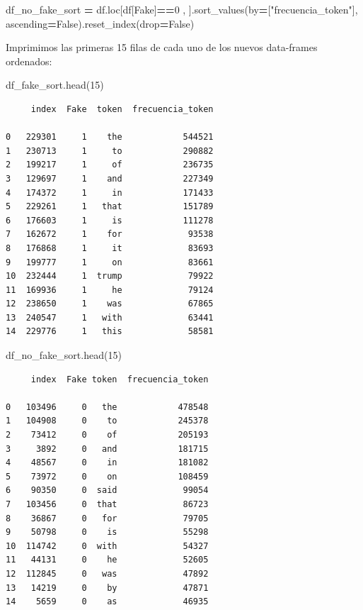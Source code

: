 \documentclass[
  11pt,
  a4paper,
]{article}
\newenvironment{Shaded}{\begin{snugshade}}{\end{snugshade}}
\newcommand{\DecValTok}[1]{\textcolor[rgb]{0.00,0.00,0.81}{#1}}
\newcommand{\NormalTok}[1]{#1}
\newcommand{\OperatorTok}[1]{\textcolor[rgb]{0.81,0.36,0.00}{\textbf{#1}}}
\newcommand{\StringTok}[1]{\textcolor[rgb]{0.31,0.60,0.02}{#1}}
\newcommand{\VariableTok}[1]{\textcolor[rgb]{0.00,0.00,0.00}{#1}}
\begin{document}
\begin{Shaded}
\begin{Highlighting}[]
\NormalTok{df\_no\_fake\_sort }\OperatorTok{=}\NormalTok{ df.loc[df[}\StringTok{\textquotesingle{}Fake\textquotesingle{}}\NormalTok{]}\OperatorTok{==}\DecValTok{0}\NormalTok{ , ].sort\_values(by}\OperatorTok{=}\NormalTok{[}\StringTok{"frecuencia\_token"}\NormalTok{], ascending}\OperatorTok{=}\VariableTok{False}\NormalTok{).reset\_index(drop}\OperatorTok{=}\VariableTok{False}\NormalTok{)}
\end{Highlighting}
\end{Shaded}

Imprimimos las primeras 15 filas de cada uno de los nuevos data-frames
ordenados:

\begin{Shaded}
\begin{Highlighting}[]
\NormalTok{df\_fake\_sort.head(}\DecValTok{15}\NormalTok{)}
\end{Highlighting}
\end{Shaded}

\begin{verbatim}
     index  Fake  token  frecuencia_token
     
0   229301     1    the            544521
1   230713     1     to            290882
2   199217     1     of            236735
3   129697     1    and            227349
4   174372     1     in            171433
5   229261     1   that            151789
6   176603     1     is            111278
7   162672     1    for             93538
8   176868     1     it             83693
9   199777     1     on             83661
10  232444     1  trump             79922
11  169936     1     he             79124
12  238650     1    was             67865
13  240547     1   with             63441
14  229776     1   this             58581
\end{verbatim}

\begin{Shaded}
\begin{Highlighting}[]
\NormalTok{df\_no\_fake\_sort.head(}\DecValTok{15}\NormalTok{)}
\end{Highlighting}
\end{Shaded}

\begin{verbatim}
     index  Fake token  frecuencia_token
     
0   103496     0   the            478548
1   104908     0    to            245378
2    73412     0    of            205193
3     3892     0   and            181715
4    48567     0    in            181082
5    73972     0    on            108459
6    90350     0  said             99054
7   103456     0  that             86723
8    36867     0   for             79705
9    50798     0    is             55298
10  114742     0  with             54327
11   44131     0    he             52605
12  112845     0   was             47892
13   14219     0    by             47871
14    5659     0    as             46935
\end{verbatim}
\end{document}
